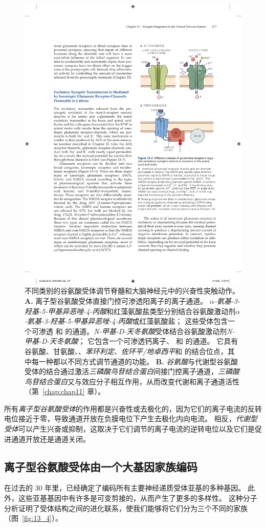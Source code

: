 \begin{figure}[htbp]
	\centering
	\includegraphics[width=0.55\linewidth]{chap13/fig_13_3}
	\caption{不同类别的谷氨酸受体调节脊髓和大脑神经元中的兴奋性突触动作。
		\textbf{A.} 离子型谷氨酸受体直接门控可渗透阳离子的离子通道。
		\textit{$\alpha$-氨基-3-羟基-5-甲基异恶唑-4-丙酸}和红藻氨酸盐类型分别结合谷氨酸激动剂\textit{$\alpha$-氨基-3-羟基-5-甲基异恶唑-4-丙酸}或红藻氨酸盐；
		这些受体包含一个可渗透  和  的通道。\textit{N-甲基-D-天冬氨酸}受体结合谷氨酸激动剂\textit{N-甲基-D-天冬氨酸}；
		它包含一个可渗透钙离子、 和  的通道。
		它具有谷氨酸、甘氨酸、、\textit{苯环利定}、\textit{佐环平/地卓西平}和  的结合位点，其中每一种都以不同方式调节通道的功能。
		\textbf{B.} \textit{谷氨酸}与代谢型谷氨酸受体的结合通过激活\textit{三磷酸鸟苷结合蛋白}间接门控离子通道，\textit{三磷酸鸟苷结合蛋白}又与效应分子相互作用，从而改变代谢和离子通道活性（第~\ref{chap:chap11} 章）。}
	\label{fig:13_3}
\end{figure}


所有\textit{离子型谷氨酸受体}的作用都是兴奋性或去极化的，因为它们的离子电流的反转电位接近于零，导致通道开放在负膜电位下产生去极化内向电流。
相反，\textit{代谢型受体}可以产生兴奋或抑制，这取决于它们调节的离子电流的逆转电位以及它们是促进通道开放还是通道关闭。



\subsection{离子型谷氨酸受体由一个大基因家族编码}

在过去的 30 年里，已经确定了编码所有主要神经递质受体亚基的多种基因。
此外，这些亚基基因中有许多是可变剪接的，从而产生了更多的多样性。
这种分子分析证明了受体结构之间的进化联系，使我们能够将它们分为三个不同的家族（图~\ref{fig:13_4}）。


